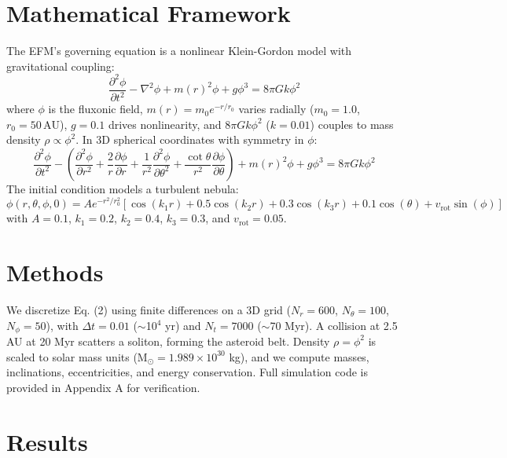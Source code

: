 \documentclass[11pt]{article}
\begin{document}
\section{Mathematical Framework}
The EFM’s governing equation is a nonlinear Klein-Gordon model with gravitational coupling:
\begin{equation}
\frac{\partial^2 \phi}{\partial t^2} - \nabla^2 \phi + m(r)^2 \phi + g \phi^3 = 8\pi G k \phi^2
\end{equation}
where \(\phi\) is the fluxonic field, \(m(r) = m_0 e^{-r/r_0}\) varies radially (\(m_0 = 1.0\), \(r_0 = 50 \, \text{AU}\)), \(g = 0.1\) drives nonlinearity, and \(8\pi G k \phi^2\) (\(k = 0.01\)) couples to mass density \(\rho \propto \phi^2\). In 3D spherical coordinates with symmetry in \(\phi\):
\begin{equation}
\frac{\partial^2 \phi}{\partial t^2} - \left( \frac{\partial^2 \phi}{\partial r^2} + \frac{2}{r} \frac{\partial \phi}{\partial r} + \frac{1}{r^2} \frac{\partial^2 \phi}{\partial \theta^2} + \frac{\cot\theta}{r^2} \frac{\partial \phi}{\partial \theta} \right) + m(r)^2 \phi + g \phi^3 = 8\pi G k \phi^2
\end{equation}
The initial condition models a turbulent nebula:
\begin{equation}
\phi(r, \theta, \phi, 0) = A e^{-r^2 / r_0^2} \left[ \cos(k_1 r) + 0.5 \cos(k_2 r) + 0.3 \cos(k_3 r) + 0.1 \cos(\theta) + v_{\text{rot}} \sin(\phi) \right]
\end{equation}
with \(A = 0.1\), \(k_1 = 0.2\), \(k_2 = 0.4\), \(k_3 = 0.3\), and \(v_{\text{rot}} = 0.05\).

\section{Methods}
We discretize Eq. (2) using finite differences on a 3D grid (\(N_r = 600\), \(N_\theta = 100\), \(N_\phi = 50\)), with \(\Delta t = 0.01\) ($\sim$10$^4$ yr) and \(N_t = 7000\) ($\sim$70 Myr). A collision at 2.5 AU at 20 Myr scatters a soliton, forming the asteroid belt. Density \(\rho = \phi^2\) is scaled to solar mass units (M$_\odot = 1.989 \times 10^{30}$ kg), and we compute masses, inclinations, eccentricities, and energy conservation. Full simulation code is provided in Appendix A for verification.

\section{Results}
\end{document}
